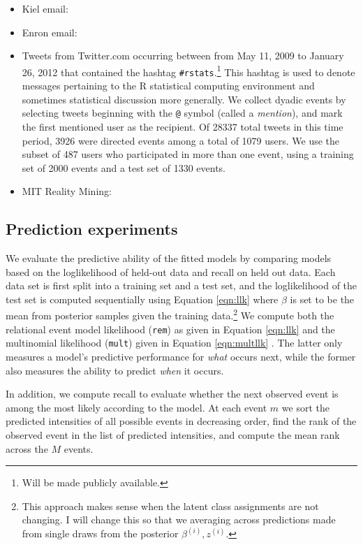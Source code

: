 \documentclass{article}
\begin{document}
\begin{itemize}
\item Kiel email: \cite{Ebel2002}
\item Enron email:
\item Tweets from Twitter.com occurring between from May 11, 2009 to January 26, 2012 that contained the hashtag \texttt{\#rstats}.\footnote{Will be made publicly available.}  This hashtag is used to denote messages pertaining to the R statistical computing environment and sometimes statistical discussion more generally.  We collect dyadic events by selecting tweets beginning with the \texttt{@} symbol (called a \emph{mention}), and mark the first mentioned user as the recipient.  Of 28337 total tweets in this time period, 3926 were directed events among a total of 1079 users.  We use the subset of 487 users who participated in more than one event, using a training set of 2000 events and a test set of 1330 events.
\item MIT Reality Mining: 
\end{itemize}

\subsection{Prediction experiments}

We evaluate the predictive ability of the fitted models by comparing models based on the loglikelihood of held-out data and recall on held out data.  Each data set is first split into a training set and a test set, and the loglikelihood of the test set is computed sequentially using Equation \ref{eqn:llk} where $\beta$ is set to be the mean from posterior samples given the training data.\footnote{This approach makes sense when the latent class assignments are not changing.  I will change this so that we averaging across predictions made from single draws from the posterior $\beta^{(i)}, z^{(i)}$.}   We compute both the relational event model likelihood  (\texttt{rem}) as given in Equation \ref{eqn:llk}  and the multinomial likelihood (\texttt{mult}) given in Equation \ref{eqn:multllk} .  The latter only measures a model's predictive performance for \emph{what} occurs next, while the former also measures the ability to predict \emph{when} it occurs.  

In addition, we compute recall to evaluate whether the next observed event is among the most likely according to the model.  At each event $m$ we sort the predicted intensities of all possible events in decreasing order, find the rank of the observed event in the list of predicted intensities, and compute the mean rank across the $M$ events.  
\end{document}
